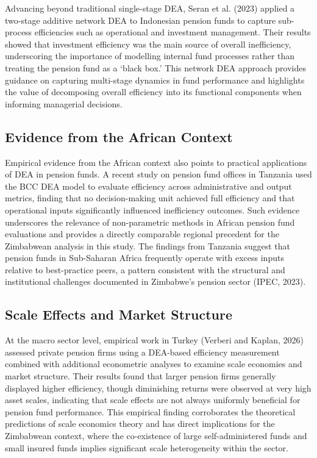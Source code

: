 \documentclass[12pt,a4paper]{article}
\begin{document}
Advancing beyond traditional single-stage DEA, Seran et al. (2023) applied a two-stage additive network DEA to Indonesian pension funds to capture sub-process efficiencies such as operational and investment management. Their results showed that investment efficiency was the main source of overall inefficiency, underscoring the importance of modelling internal fund processes rather than treating the pension fund as a `black box.' This network DEA approach provides guidance on capturing multi-stage dynamics in fund performance and highlights the value of decomposing overall efficiency into its functional components when informing managerial decisions.

\subsection{Evidence from the African Context}

Empirical evidence from the African context also points to practical applications of DEA in pension funds. A recent study on pension fund offices in Tanzania used the BCC DEA model to evaluate efficiency across administrative and output metrics, finding that no decision-making unit achieved full efficiency and that operational inputs significantly influenced inefficiency outcomes. Such evidence underscores the relevance of non-parametric methods in African pension fund evaluations and provides a directly comparable regional precedent for the Zimbabwean analysis in this study. The findings from Tanzania suggest that pension funds in Sub-Saharan Africa frequently operate with excess inputs relative to best-practice peers, a pattern consistent with the structural and institutional challenges documented in Zimbabwe's pension sector (IPEC, 2023).

\subsection{Scale Effects and Market Structure}

At the macro sector level, empirical work in Turkey (Verberi and Kaplan, 2026) assessed private pension firms using a DEA-based efficiency measurement combined with additional econometric analyses to examine scale economies and market structure. Their results found that larger pension firms generally displayed higher efficiency, though diminishing returns were observed at very high asset scales, indicating that scale effects are not always uniformly beneficial for pension fund performance. This empirical finding corroborates the theoretical predictions of scale economics theory and has direct implications for the Zimbabwean context, where the co-existence of large self-administered funds and small insured funds implies significant scale heterogeneity within the sector.
\end{document}
